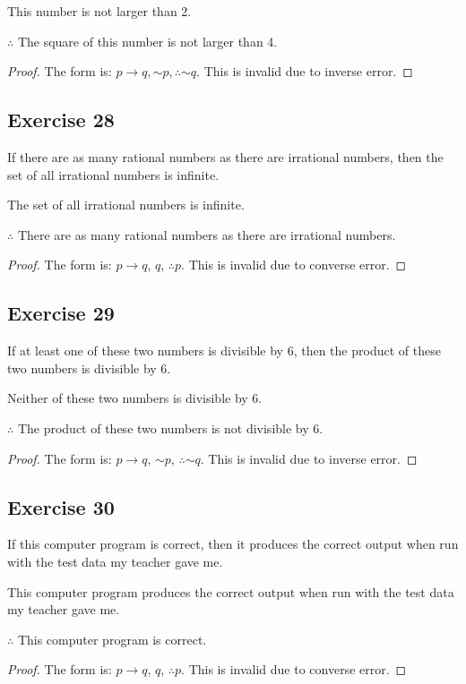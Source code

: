 \documentclass[14pt]{extarticle}
\begin{document}
This number is not larger than 2.

$\therefore$ The square of this number is not larger than 4.

\begin{proof}
    The form is: $p \to q, {\sim p}, \therefore {\sim q}$. This is invalid due to inverse error.
\end{proof}

\subsection{Exercise 28}
If there are as many rational numbers as there are irrational numbers, then the set of all irrational numbers is infinite.

The set of all irrational numbers is infinite.

$\therefore$ There are as many rational numbers as there are irrational numbers.

\begin{proof}
    The form is: $p \to q$, $q$, $\therefore p$. This is invalid due to converse error.
\end{proof}

\subsection{Exercise 29}
If at least one of these two numbers is divisible by 6, then the product of these two numbers is divisible by 6.

Neither of these two numbers is divisible by 6.

$\therefore$ The product of these two numbers is not divisible by 6.

\begin{proof}
    The form is: $p \to q$, ${\sim p}$, $\therefore {\sim q}$. This is invalid due to inverse error.
\end{proof}

\subsection{Exercise 30}
If this computer program is correct, then it produces the correct output when run with the test data my teacher gave me.

This computer program produces the correct output when run with the test data my teacher gave me.

$\therefore$ This computer program is correct.

\begin{proof}
    The form is: $p \to q$, $q$, $\therefore p$. This is invalid due to converse error.
\end{proof}
\end{document}
